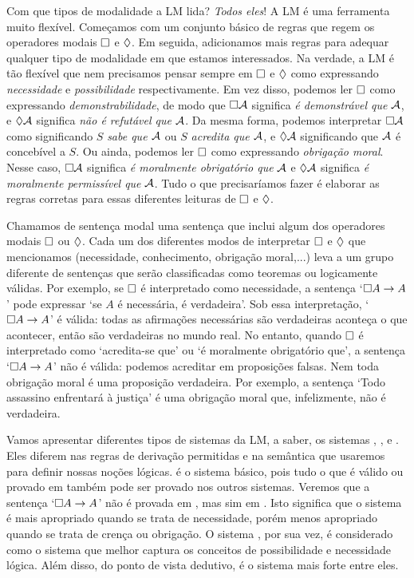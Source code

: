Com que tipos de modalidade a LM lida? \emph{Todos eles}! A LM é uma ferramenta muito flexível. Começamos com um conjunto básico de regras que regem os operadores modais $\Box$ e $\Diamond$. Em seguida, adicionamos mais regras para adequar qualquer tipo de modalidade em que estamos interessados. Na verdade, a LM é tão flexível que nem precisamos pensar sempre em $\Box$ e $\Diamond$ como expressando \emph{necessidade} e \emph{possibilidade} respectivamente. Em vez disso, podemos ler $\Box$ como expressando \emph{demonstrabilidade}, de modo que $\Box\mathcal{A}$ significa   \emph{é demonstrável que} $\mathcal{A}$, e $\Diamond\mathcal{A}$ significa \emph{não é refutável que} $\mathcal{A}$. Da mesma forma, podemos interpretar $\Box\mathcal{A}$ como significando $S$ \emph{sabe que  $\mathcal{A}$} ou $S$ \emph{acredita que $\mathcal{A}$}, e $\Diamond \mathcal{A}$ significando que $\mathcal{A}$ é concebível a $S$. Ou ainda, podemos ler $\Box$ como expressando \emph{obrigação moral}. Nesse caso, $\Box \mathcal{A}$ significa \emph{é moralmente obrigatório que} $\mathcal{A}$ e $\Diamond \mathcal{A}$ significa \emph{é moralmente permissível que} $\mathcal{A}$. Tudo o que precisaríamos fazer é elaborar as regras corretas para essas diferentes leituras de $\Box$ e $\Diamond$.

Chamamos de sentença modal uma sentença que inclui algum dos operadores modais   $\Box$ ou $\Diamond$. Cada um dos diferentes modos de interpretar $\Box$ e $\Diamond$ que mencionamos (necessidade, conhecimento, obrigação moral,...) leva a um  grupo diferente de sentenças que serão classificadas como teoremas ou logicamente válidas. Por exemplo, se $\Box$ é interpretado como necessidade, a sentença `$\Box A \rightarrow A$' pode expressar `se $A$ é necessária, é verdadeira'.
  Sob essa  interpretação,  `$\Box A \rightarrow A$' é válida: todas as afirmações necessárias são verdadeiras aconteça o que acontecer, então são verdadeiras no mundo real. No entanto, quando   $\Box$  é interpretado como `acredita-se que' ou `é moralmente obrigatório que',  a sentença 
  `$\Box A \rightarrow A$' não é válida: podemos acreditar em proposições falsas. Nem toda obrigação moral é uma proposição verdadeira. Por exemplo, a sentença ‘Todo assassino enfrentará à justiça’ é uma obrigação moral que, infelizmente, não é verdadeira.

Vamos apresentar diferentes tipos de sistemas da LM, a saber, os sistemas  \mlK, \mlT, \mlSfour{} e \mlSfive.  Eles diferem nas regras de derivação permitidas e na semântica que usaremos para definir nossas noções lógicas.  \mlK{} é o sistema  básico, pois tudo o que é válido ou provado em \mlK{} também pode ser provado nos outros sistemas. 
Veremos que a sentença  `$\Box A \rightarrow A$'   não é provada em \mlK, mas sim em  \mlT. Isto significa que o sistema \mlT{} é mais apropriado quando se trata de necessidade, porém menos apropriado quando se trata de crença ou obrigação.
O  sistema  \mlSfive,  por sua vez, é considerado como o sistema que melhor  captura os conceitos de possibilidade e necessidade lógica. Além disso, do ponto de vista dedutivo,  \mlSfive{} é o sistema mais forte entre eles.

